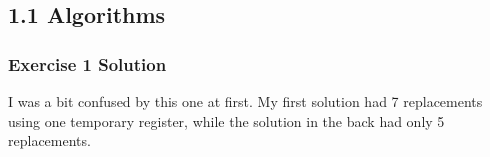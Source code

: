 \subsection*{1.1 Algorithms}
\subsubsection*{Exercise 1 Solution}
I was a bit confused by this one at first. My first solution had 7 replacements
using one temporary register, while the solution in the back had only 5
replacements.
